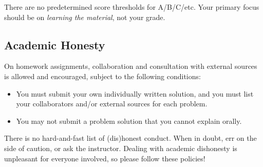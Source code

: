 \documentclass[11pt]{article}
\begin{document}
There are no predetermined score thresholds for A/B/C/etc.  Your
primary focus should be on \emph{learning the material}, not your
grade.

\subsection{Academic Honesty}
\label{sec:academic-honesty}

On homework assignments, collaboration and consultation with external
sources is allowed and encouraged, subject to the following
conditions:
\begin{itemize}[itemsep=0pt]
\item You must submit your own individually written solution, and you
  must list your collaborators and/or external sources for each
  problem.
\item You may not submit a problem solution that you cannot explain
  orally.
\end{itemize}

There is no hard-and-fast list of (dis)honest conduct.  When in doubt,
err on the side of caution, or ask the instructor.  Dealing with
academic dishonesty is unpleasant for everyone involved, so please
follow these policies!
\end{document}
